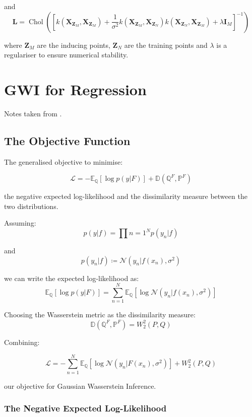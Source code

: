 \documentclass[twoside,11pt]{article}
\newcommand{\Chol}{\operatorname{Chol}}
\begin{document}
and
\[\mathbf{L} = \Chol\left( \left[k(\mathbf{X}_{\mathbf{Z}_{M}}, \mathbf{X}_{\mathbf{Z}_{M}}) + \frac{1}{\sigma^2} k(\mathbf{X}_{\mathbf{Z}_{M}}, \mathbf{X}_{\mathbf{Z}_{N}})k(\mathbf{X}_{\mathbf{Z}_{N}}, \mathbf{X}_{\mathbf{Z}_{M}}) + \lambda \mathbf{I}_M\right]^{-1}\right)\]

where $\mathbf{Z}_{M}$ are the inducing points, $\mathbf{Z}_{N}$ are the training points and $\lambda$ is a regulariser to ensure numerical stability.


\section{GWI for Regression}\label{sec:gwi-for-regression}

Notes taken from \cite{wild2022generalized}.

\subsection{The Objective Function}\label{subsec:gwi-for-regression-the-liss}


The generalised objective to minimise:

\[\mathcal{L} = - \mathbb{E}_{\mathbb{Q}}\left[ \log p(y |F)\right] + \mathbb{D}(\mathbb{Q}^F, \mathbb{P}^F)\]

the negative expected log-likelihood and the dissimilarity measure between the two distributions.

Assuming:
\[p(y|f) = \prod{n=1}^N p(y_n | f)\]

and
\[p(y_n | f) \coloneqq \mathcal{N}(y_n| f(x_n), \sigma^2)\]

we can write the expected log-likelihood as:
\[\mathbb{E}_{\mathbb{Q}}\left[ \log p(y |F)\right] =\sum_{n=1}^N \mathbb{E}_{\mathbb{Q}}\left[\log \mathcal{N}(y_n| f(x_n), \sigma^2)\right]\]


Choosing the Wasserstein metric as the dissimilarity measure:
\[\mathbb{D}(\mathbb{Q}^F, \mathbb{P}^F) = W_2^2(P, Q)\]

Combining:

\[\mathcal{L} = - \sum_{n=1}^N \mathbb{E}_{\mathbb{Q}}\left[ \log \mathcal{N}(y_n |F(x_n), \sigma^2)\right] + W_2^2(P, Q)\]

our objective for Gaussian Wasserstein Inference.

\subsubsection{The Negative Expected Log-Likelihood}
\end{document}

